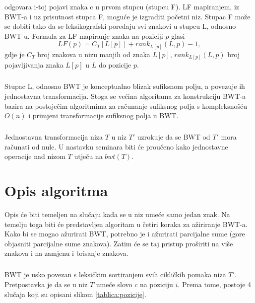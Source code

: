 \documentclass{ferseminar}
\begin{document}
odgovara i-toj pojavi znaka c u prvom stupcu (stupcu F). LF mapiranjem, iz BWT-a i uz prisutnost stupca F, moguće je izgraditi početni niz. Stupac F može se dobiti tako da se leksikografski poredaju svi znakovi u stupcu L, odnosno BWT-u.
Formula za LF mapiranje znaka na poziciji $p$ glasi 
\begin{equation}
	LF(p)=C_T[L[p]]+rank_{L[p]}(L,p)-1 ,
\end{equation}
gdje je $C_T$ broj znakova u nizu manjih od znaka $L[p]$, $rank_{L[p]}(L,p)$ broj pojavljivanja znaka $L[p]$ u $L$ do pozicije $p$.
\subparagraph{}
Stupac L, odnosno BWT je konceptualno blizak sufiksnom polju, a povezuje ih jednostavna transformacija. Stoga se većina algoritama za konstrukciju BWT-a bazira na postoječim algoritmima za računanje sufiksnog polja s kompleksnošću $O(n)$ i primjeni transformacije sufiksnog polja u BWT.
\subparagraph{}
Jednostavna transformacija niza $T$ u niz $T'$ uzrokuje da se BWT od $T'$ mora računati od nule. U nastavku seminara biti će proučeno kako jednostavne operacije nad nizom $T$ utječu na $bwt(T)$. 
\section{Opis algoritma}
Opis će biti temeljen na slučaju kada se u niz umeće samo jedan znak. Na temelju toga biti će predstavljen algoritam u četiri koraka za ažiriranje BWT-a. Kako bi se mogao ažurirati BWT, potrebno je i ažurirati parcijalne sume (gore objasniti parcijalne sume znakova). Zatim će se taj pristup proširiti na više znakova i na zamjenu i brisanje znakova.
\subparagraph{}
BWT je usko povezan s leksičkim sortiranjem svih cikličkih pomaka niza $T'$. Pretpostavka je da se u niz $T$ umeće slovo $c$ na poziciju $i$. Prema tome, postoje 4 slučaja koji su opisani slikom \ref{tablica:pozicije}. 
\end{document}
